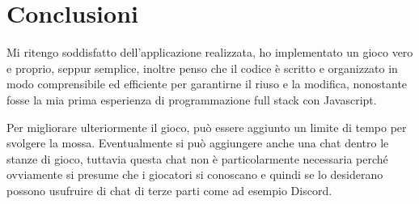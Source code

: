\section{Conclusioni}

Mi ritengo soddisfatto dell'applicazione realizzata, ho implementato un gioco vero e proprio, seppur semplice, inoltre penso che il codice è scritto e organizzato in modo comprensibile ed efficiente per garantirne il riuso e la modifica, nonostante fosse la mia prima esperienza di programmazione full stack con Javascript.

Per migliorare ulteriormente il gioco, può essere aggiunto un limite di tempo per svolgere la mossa. Eventualmente si può aggiungere anche una chat dentro le stanze di gioco, tuttavia questa chat non è particolarmente necessaria perché ovviamente si presume che i giocatori si conoscano e quindi se lo desiderano possono usufruire di chat di terze parti come ad esempio Discord.

\newpage